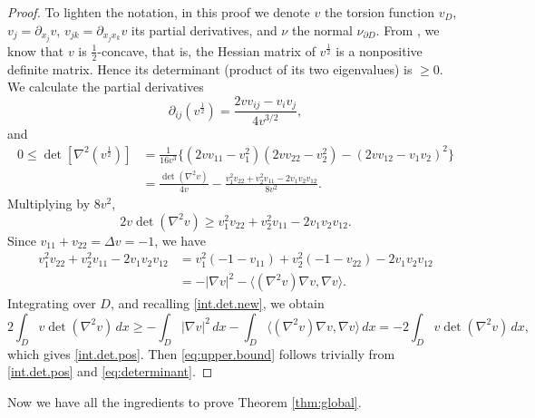 \documentclass[10pt,reqno,a4paper]{article}
\numberwithin{equation}{section}
\theoremstyle{plain}
\theoremstyle{definition}
\newcommand{\la}{\langle}
\newcommand{\ra}{\rangle}
\newcommand{\pa}{\partial}
\newcommand{\grad}{\nabla}
\newcommand{\Hess}{\grad^2}
\begin{document}
\begin{proof} 
To lighten the notation, in this proof we denote $v$ the torsion function $v_D$, 
$v_j = \pa_{x_j} v$, $v_{jk} = \pa_{x_j x_k} v$ its partial derivatives,
and $\nu$ the normal $\nu_{\pa D}$.
From \cite{ML}, we know that $v$ is $\frac12$-concave, that is, the Hessian matrix of $v^{\frac12}$ 
is a nonpositive definite matrix. 
Hence its determinant (product of its two eigenvalues) is $\geq 0$. 
We calculate the partial derivatives 
\[
\pa_{ij} (v^{\frac12}) %
= \frac{ 2 v v_{ij} - v_i v_j }{ 4 v^{3/2} },
\]
and 
\begin{align*}
0 \leq \det[ \Hess (v^{\frac12}) ] 
& = \frac{1}{16 v^3} \big\{ (2 v v_{11} - v_1^2)(2 v v_{22} - v_2^2) - (2 v v_{12} - v_1 v_2)^2 \big\} 
\\ 
& = \frac{\det (\Hess v)}{4v} 
- \frac{ v_1^2 v_{22} + v_2^2 v_{11} - 2 v_1 v_2 v_{12} }{8 v^2}.
\end{align*}
Multiplying by $8 v^2$, 
\[
2 v \det (\Hess v) \geq v_1^2 v_{22} + v_2^2 v_{11} - 2 v_1 v_2 v_{12}.
\]
Since $v_{11} + v_{22} = \Delta v = -1$, we have 
\begin{align*}
v_1^2 v_{22} + v_2^2 v_{11} - 2 v_1 v_2 v_{12}
& = v_1^2 (- 1 - v_{11}) + v_2^2 (- 1 - v_{22}) 
- 2 v_1 v_2 v_{12}
\\ 
& = - |\grad v|^2 - \la (\Hess v) \grad v , \grad v \ra.
\end{align*}
Integrating over $D$, and recalling \eqref{int.det.new}, we obtain
\[
2 \int_D v \det (\Hess v) \, dx 
\geq - \int_D |\grad v|^2 \, dx - \int_D \la (\Hess v) \grad v , \grad v \ra \, dx
= - 2 \int_D v \det (\Hess v) \, dx,
\]
which gives \eqref{int.det.pos}. 
Then \eqref{eq:upper.bound} follows trivially from \eqref{int.det.pos} and \eqref{eq:determinant}.
\end{proof}

Now we have all the ingredients to prove Theorem \ref{thm:global}.
\end{document}
